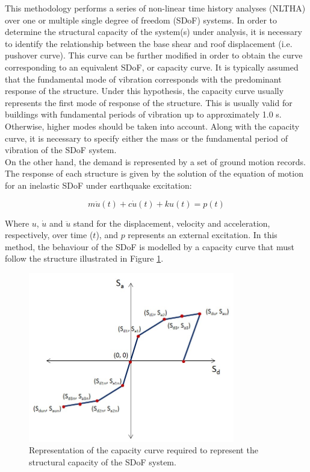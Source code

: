 This methodology performs a series of non-linear time history analyses (NLTHA) over one or multiple single degree of freedom (SDoF) systems. In order to determine the structural capacity of the system(s) under analysis, it is necessary to identify the relationship between the base shear and roof displacement (i.e. pushover curve). This curve can be further modified in order to obtain the curve corresponding to an equivalent SDoF, or capacity curve. It is typically assumed that the fundamental mode of vibration corresponds with the predominant response of the structure. Under this hypothesis, the capacity curve usually represents the first mode of response of the structure. This is usually valid for buildings with fundamental periods of vibration up to approximately 1.0 s. Otherwise, higher modes should be taken into account. Along with the capacity curve, it is necessary to specify either the mass or the fundamental period of vibration of the SDoF system.\\

On the other hand, the demand is represented by a set of ground motion records. The response of each structure is given by the solution of the equation of motion for an inelastic SDoF under earthquake excitation:

\begin{equation}
m\ddot{u}(t) + c\dot{u}(t) + ku(t) = p(t)
\end{equation}

Where $u$, $\dot{u}$ and $\ddot{u}$ stand for the displacement, velocity and acceleration, respectively, over time ($t$), and $p$ represents an external excitation. In this method, the behaviour of the SDoF is modelled by a capacity curve that must follow the structure illustrated in Figure \ref{fig:backbone}.

\begin{figure}[htb]
  \centering
      \includegraphics[width=9cm]{Figures/backbone_curve.png}
  \caption{Representation of the capacity curve required to represent the structural capacity of the SDoF system.}
  \label{fig:backbone}
\end{figure}

